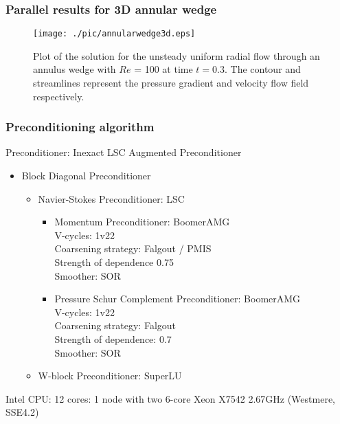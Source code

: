 \documentclass{beamer}
\begin{document}
\begin{frame} \frametitle{Parallel results for 3D annular wedge}
\begin{figure}[H]
    \centering
    \texttt{[image: ./pic/annularwedge3d.eps]}
    \caption{Plot of the solution for the unsteady uniform radial flow
      through an annulus wedge with $Re$ = 100 at
      time $t = 0.3$. The contour and streamlines represent the pressure
      gradient and velocity flow field respectively.}
    \label{fig:annularwedge3d}
\end{figure}
\end{frame}

\begin{frame}\frametitle{Preconditioning algorithm}
Preconditioner: Inexact LSC Augmented Preconditioner
\begin{itemize}
  \item Block Diagonal Preconditioner
    \begin{itemize}
      \item{Navier-Stokes Preconditioner:} LSC
        \begin{itemize}
          \item{Momentum Preconditioner:} BoomerAMG \\
           V-cycles: 1v22 \\ 
           Coarsening strategy: Falgout / PMIS \\
           Strength of dependence 0.75 \\
           Smoother: SOR 
          \item{Pressure Schur Complement Preconditioner:} BoomerAMG \\
           V-cycles: 1v22 \\
           Coarsening strategy: Falgout \\
           Strength of dependence: 0.7 \\
           Smoother: SOR \\
          \end{itemize}

      \item{W-block Preconditioner:} SuperLU
      \end{itemize}
  \end{itemize}
  Intel CPU: 12 cores: 1 node with two 6-core Xeon X7542 2.67GHz (Westmere, SSE4.2)
\end{frame}
\end{document}
